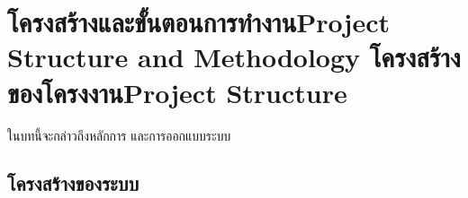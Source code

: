 \chapter{\ifproject%
\ifcpe โครงสร้างและขั้นตอนการทำงาน\else Project Structure and Methodology\fi
\else%
\ifcpe โครงสร้างของโครงงาน\else Project Structure\fi
\fi
}

ในบทนี้จะกล่าวถึงหลักการ และการออกแบบระบบ

\makeatletter


\makeatother



\section{โครงสร้างของระบบ}




